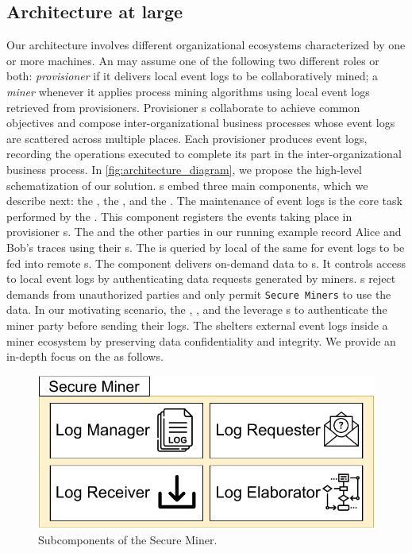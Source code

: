 \subsection{Architecture at large}
Our architecture involves different organizational ecosystems characterized by one or more machines. An  may assume one of the following two different roles or both: \textit{provisioner} if it delivers local event logs to be collaboratively mined; a \textit{miner} whenever it applies process mining algorithms using local event logs retrieved from provisioners. Provisioner s collaborate to achieve common objectives and compose inter-organizational business processes whose event logs are scattered across multiple places. Each provisioner produces event logs, recording the operations executed to complete its part in the inter-organizational business process.  In \cref{fig:architecture_diagram}, we propose the high-level schematization of our solution. s embed three main components, which we describe next: the , the , and the . The maintenance of event logs is the core task performed by the . This component registers the events taking place in provisioner s.  The  and the other parties in our running example record Alice and Bob's traces using their s. The  is queried by local  of the same  for event logs to be fed into remote s. The  component delivers on-demand data to s. It controls access to local event logs by authenticating data requests generated by miners. s reject demands from unauthorized parties and only permit \texttt{Secure Miners} to use the data. In our motivating scenario, the , , and the  leverage s to authenticate the miner party before sending their logs. The  shelters external event logs inside a miner ecosystem by preserving data confidentiality and integrity.  We provide an in-depth focus on the  as follows.
\begin{figure}[t]
	\centering
	\includegraphics[width=0.5\linewidth]{content/figures/secureminer.pdf}
	\caption{Subcomponents of the Secure Miner.}
	\label{fig:trusted_miner}
\end{figure}

